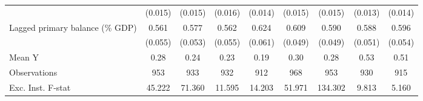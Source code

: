 {\begin{tabular}{l*{8}{c}}
                    &     (0.015)         &     (0.015)         &     (0.016)         &     (0.014)         &     (0.015)         &     (0.015)         &     (0.013)         &     (0.014)         \\
\addlinespace
Lagged primary balance (\% GDP)&       0.561\sym{***}&       0.577\sym{***}&       0.562\sym{***}&       0.624\sym{***}&       0.609\sym{***}&       0.590\sym{***}&       0.588\sym{***}&       0.596\sym{***}\\
                    &     (0.055)         &     (0.053)         &     (0.055)         &     (0.061)         &     (0.049)         &     (0.049)         &     (0.051)         &     (0.054)         \\
\midrule
Mean Y              &        0.28         &        0.24         &        0.23         &        0.19         &        0.30         &        0.28         &        0.53         &        0.51         \\
Observations        &         953         &         933         &         932         &         912         &         968         &         953         &         930         &         915         \\
Exc. Inst. F-stat   &      45.222         &      71.360         &      11.595         &      14.203         &      51.971         &     134.302         &       9.813         &       5.160         \\
\bottomrule
\end{tabular}
}
